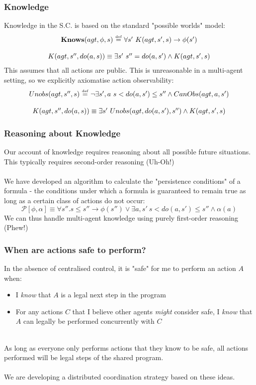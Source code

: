 \documentclass{beamer}
\newcommand{\isdef}{\hbox{$\stackrel{\mbox{\tiny def}}{=}$}}
\begin{document}
\begin{frame}
\frametitle{Knowledge}
Knowledge in the S.C. is based on the standard "possible worlds" model:
\[
\begin{array}{c}
\mathbf{Knows}(agt,\phi,s)\ \isdef\ \forall s'\ K(agt,s',s) \rightarrow \phi(s')\\
\\
K(agt,s'',do(a,s)) \equiv \exists s'\ s''=do(a,s') \wedge K(agt,s',s)
\end{array}
\]
\pause
This assumes that all actions are public.  This is unreasonable
in a multi-agent setting, so we explicitly axiomatise action observability:
\[
\begin{array}{c}
Unobs(agt,s'',s)\ \isdef\ \neg\exists s',a\ s<do(a,s')\leq s'' \wedge CanObs(agt,a,s')\\
\\
K(agt,s'',do(a,s)) \equiv \exists s'\ Unobs(agt,do(a,s'),s'') \wedge K(agt,s',s)
\end{array}
\]

\end{frame}

\begin{frame}
\frametitle{Reasoning about Knowledge}
Our account of knowledge requires reasoning about all possible future
situations.  This typically requires second-order reasoning (Uh-Oh!)
\pause
\ \\
\ \\
We have developed an algorithm to calculate the "persistence conditions"
of a formula - the conditions under which a formula is guaranteed to
remain true as long as a certain class of actions do not occur:
\[
\mathcal{P}[\phi,\alpha] \equiv \forall s'' . s \leq s'' \rightarrow \phi(s'') \vee \exists a,s'\ s<do(a,s')\leq s'' \wedge \alpha(a)
\]
\pause
We can thus handle multi-agent knowledge using purely first-order reasoning
(Phew!)
\end{frame}

\begin{frame}
\frametitle{When are actions safe to perform?}
In the absence of centralised control, it is "safe" for me to perform
an action $A$ when:
\begin{itemize}
  \item I \emph{know} that $A$ is a legal next step in the program
  \item For any actions $C$ that I believe other agents \emph{might} consider
safe, I \emph{know} that $A$ can legally be performed concurrently with $C$
\end{itemize}
\ \\
As long as everyone only performs actions that they know to be safe, all
actions performed will be legal steps of the shared program.
\ \\
\ \\
We are developing a distributed coordination strategy based on these ideas.
\end{frame}
\end{document}
